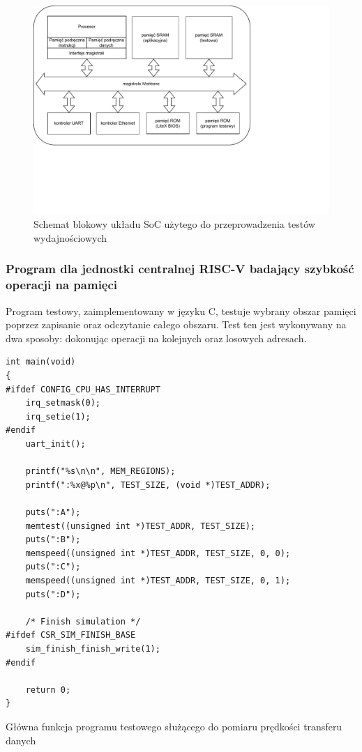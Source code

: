\begin{figure}[H]
	\centering
	\includegraphics[scale=1,trim={0 4.9cm 5.6cm 0},clip]{testing/benchmark-soc-diag.pdf}
	\caption{Schemat blokowy układu SoC użytego do przeprowadzenia testów wydajnościowych}
	\label{fig:benchmark-soc-diag}
\end{figure}

\subsubsection{Program dla jednostki centralnej RISC-V badający szybkość operacji na pamięci}

Program testowy, zaimplementowany w języku C, testuje wybrany obszar pamięci poprzez zapisanie oraz odczytanie całego obszaru. Test ten jest wykonywany na dwa sposoby: dokonując operacji na kolejnych oraz losowych adresach.

\begin{longlisting}
\begin{verbatim}
int main(void)
{
#ifdef CONFIG_CPU_HAS_INTERRUPT
    irq_setmask(0);
    irq_setie(1);
#endif
    uart_init();

    printf("%s\n\n", MEM_REGIONS);
    printf(":%x@%p\n", TEST_SIZE, (void *)TEST_ADDR);

    puts(":A");
    memtest((unsigned int *)TEST_ADDR, TEST_SIZE);
    puts(":B");
    memspeed((unsigned int *)TEST_ADDR, TEST_SIZE, 0, 0);
    puts(":C");
    memspeed((unsigned int *)TEST_ADDR, TEST_SIZE, 0, 1);
    puts(":D");

    /* Finish simulation */
#ifdef CSR_SIM_FINISH_BASE
    sim_finish_finish_write(1);
#endif

    return 0;
}
\end{verbatim}
\caption{\label{lst:benchmark-main.c}Główna funkcja programu testowego służącego do pomiaru prędkości transferu danych}
\end{longlisting}

